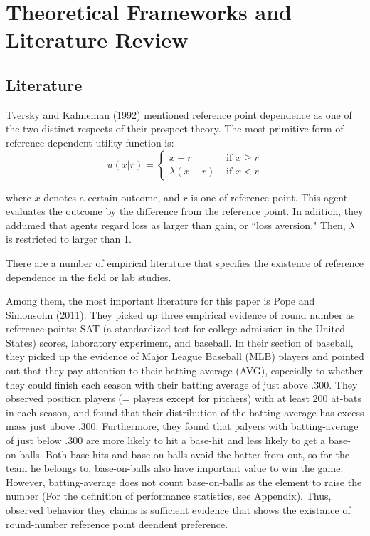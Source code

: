 \documentclass[dvipdfmx]{article}
\begin{document}
\section{Theoretical Frameworks and Literature Review}

 \subsection{Literature}

  Tversky and Kahneman (1992) mentioned reference point dependence
  as one of the two distinct respects of their prospect theory.
  The most primitive form of reference dependent utility function is:
  \[
  u(x | r) = \begin{cases}
  x - r & \text{ if }x \geq r \\
  \lambda (x - r) & \text{ if }x < r
\end{cases}
  \]

  where $x$ denotes a certain outcome, and $r$ is one of
  reference point. This agent evaluates the outcome by the
  difference from the reference point. In adiition, they
  addumed that agents regard loss as larger than gain,
  or ``loss aversion." Then, $\lambda$ is restricted to larger than 1.

  There are a number of empirical literature that specifies the existence
  of reference dependence in the field or lab studies.

  Among them, the most important literature for this paper is Pope and
  Simonsohn (2011). They picked up three empirical evidence of round number
  as reference points: SAT (a standardized test for college admission in the
  United States) scores, laboratory experiment, and baseball.
  In their section of baseball, they picked up the evidence of
  Major League Baseball (MLB) players and pointed out that they pay attention
  to their batting-average (AVG), especially to whether they could finish
  each season with their batting average of just above .300.
  They observed position players (= players except for pitchers) with at
  least 200 at-bats in each season, and found that their distribution
  of the batting-average has excess mass just above .300.
  Furthermore, they found that palyers with batting-average of just below
  .300 are more likely to hit a base-hit and less likely to get a
  base-on-balls.
  Both base-hits and base-on-balls avoid the batter from out, so for the
  team he belongs to, base-on-balls also have important value to win the
  game. However, batting-average does not count base-on-balls as the
  element to raise the number (For the definition of performance
  statistics, see Appendix). Thus, observed behavior they claims is
  sufficient evidence that shows the existance of round-number reference
  point deendent preference.
\end{document}
